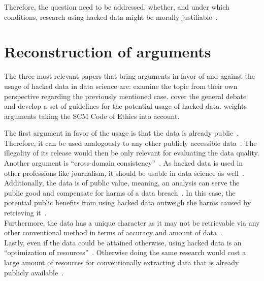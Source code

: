 Therefore, the question need to be addressed, whether, and under which conditions, research using hacked data might be morally justifiable~\parencite[][745]{nature}.

\section*{Reconstruction of arguments}

The three most relevant papers that bring arguments in favor of and against the usage of hacked data in data science are:
\cite{patreon} examine the topic from their own perspective regarding the previously mentioned case.
\cite{nature} cover the general debate and develop a set of guidelines for the potential usage of hacked data.
\cite{acm} weights arguments taking the SCM Code of Ethics into account.

The first argument in favor of the usage is that the data is already public~\parencite[][5]{patreon}.
Therefore, it can be used analogously to any other publicly accessible data~\parencite[][23]{acm}.
The illegality of its release would then be only relevant for evaluating the data quality.\\
Another argument is ``cross-domain consistency''~\parencite[][746]{nature}.
As hacked data is used in other professions like journalism, it should be usable in data science as well~\parencite[][745]{nature}.\\
Additionally, the data is of public value, meaning, an analysis can serve the public good and compensate for harms of a data breach~\parencites[][5]{patreon}[][23]{acm}.
In this case, the potential public benefits from using hacked data outweigh the harms caused by retrieving it~\parencite[][23]{acm}.\\
Furthermore, the data has a unique character as it may not be retrievable via any other conventional method in terms of accuracy and amount of data~\parencites[][745]{nature}[][5]{patreon}.\\
Lastly, even if the data could be attained otherwise, using hacked data is an ``optimization of resources''~\parencite[][746]{nature}.
Otherwise doing the same research would cost a large amount of resources for conventionally extracting data that is already publicly available~\parencite[][745]{nature}.

